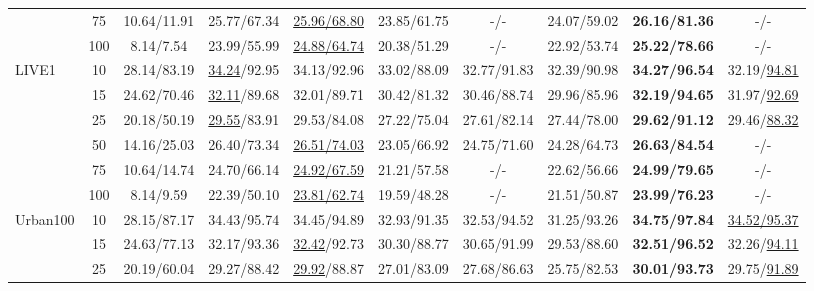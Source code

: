 \documentclass[10pt,journal,compsoc]{IEEEtran}
\newcommand\bdr[1]{{\textbf{#1}}}
\newcommand\bdb[1]{{\underline{#1}}}
\begin{document}
\begin{table*}[t!]
\begin{scriptsize}
\begin{center}
\begin{tabular}{l c c ccccccc}
& 75  & 10.64/11.91 & 25.77/67.34 & \bdb{25.96/68.80} & 23.85/61.75 & -/- & 24.07/59.02 & \bdr{26.16/81.36} & -/- \\

& 100 & 8.14/7.54 & 23.99/55.99 & \bdb{24.88/64.74} & 20.38/51.29 & -/- & 22.92/53.74 & \bdr{25.22/78.66} & -/- \\

\hline


\multirow{6}{*}{LIVE1}

& 10  & 28.14/83.19 & \bdb{34.24}/92.95 & 34.13/92.96 & 33.02/88.09 & 32.77/91.83 & 32.39/90.98 & \bdr{34.27/96.54} & 32.19/\bdb{94.81}\\

& 15  & 24.62/70.46 & \bdb{32.11}/89.68 & 32.01/89.71 & 30.42/81.32 & 30.46/88.74 & 29.96/85.96 & \bdr{32.19/94.65} & 31.97/\bdb{92.69}\\

& 25  & 20.18/50.19 & \bdb{29.55}/83.91 & 29.53/84.08 & 27.22/75.04 & 27.61/82.14 & 27.44/78.00 & \bdr{29.62/91.12} & 29.46/\bdb{88.32}\\

& 50  & 14.16/25.03 & 26.40/73.34 & \bdb{26.51/74.03} & 23.05/66.92 & 24.75/71.60 & 24.28/64.73 & \bdr{26.63/84.54} & -/- \\

& 75  & 10.64/14.74 & 24.70/66.14 & \bdb{24.92/67.59} & 21.21/57.58 & -/- & 22.62/56.66 & \bdr{24.99/79.65} & -/- \\

& 100 & 8.14/9.59 & 22.39/50.10 & \bdb{23.81/62.74} & 19.59/48.28 & -/- & 21.51/50.87 & \bdr{23.99/76.23} & -/- \\

\hline


\multirow{6}{*}{Urban100}

& 10  & 28.15/87.17 & 34.43/95.74 & 34.45/94.89 & 32.93/91.35 & 32.53/94.52 & 31.25/93.26 & \bdr{34.75/97.84} & \bdb{34.52/95.37}\\

& 15  & 24.63/77.13 & 32.17/93.36 & \bdb{32.42}/92.73 & 30.30/88.77 & 30.65/91.99 & 29.53/88.60 & \bdr{32.51/96.52} & 32.26/\bdb{94.11}\\

& 25  & 20.19/60.04 & 29.27/88.42 & \bdb{29.92}/88.87 & 27.01/83.09 & 27.68/86.63 & 25.75/82.53 & \bdr{30.01/93.73} & 29.75/\bdb{91.89}\\


\end{tabular}
\end{center}
\end{scriptsize}
\end{table*}
\end{document}
